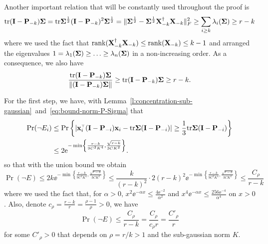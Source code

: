 \documentclass{article}
\begin{document}

Another important relation that will be constantly used throughout the proof is
\begin{equation}\label{eq:bound-trace-P-Sigma}
    \mathrm{tr} (\mathbf I - \mathbf P_{-k}) \mathbf{\Sigma} = \mathrm{tr} \mathbf{\Sigma}^{\frac12} (\mathbf I - \mathbf P_{-k})^2 \mathbf{\Sigma}^{\frac12} =
    \|\mathbf{\Sigma}^{\frac12}-\mathbf{\Sigma}^{\frac12}\mathbf X_{-k}^\dagger\mathbf X_{-k}\|_F^2\geq
\sum_{i\geq k}\lambda_i (\mathbf{\Sigma})\geq r-k
\end{equation}
where we used the fact that $\mathrm{rank}(\mathbf X_{-k}^\dagger \mathbf X_{-k}) \le \mathrm{rank}(\mathbf X_{-k}) \le k-1$ and arranged the eigenvalues $ 1 = \lambda_1(\mathbf{\Sigma}) \ge \ldots \ge \lambda_n(\mathbf{\Sigma})$ in a non-increasing order. As a consequence, we also have
\begin{equation}\label{eq:bound-norm-P-Sigma}
  \frac{\mathrm{tr} (\mathbf I - \mathbf P_{-k}) \mathbf{\Sigma}}{ \|  (\mathbf I - \mathbf P_{-k}) \mathbf{\Sigma} \| } \ge \mathrm{tr} (\mathbf I - \mathbf P_{-k}) \mathbf{\Sigma} \geq r-k.
\end{equation}

\bigskip

For the first step, we have, with Lemma~\ref{l:concentration-sub-gaussian}~and~\eqref{eq:bound-norm-P-Sigma} that
\begin{align*}
  \Pr (\neg E_i) &\le \Pr \left\{ \lvert \x_i^\top (\I - \P_{-i}) \x_i - \tr \Sigmab (\I - \P_{-i})  \rvert
    \geq \frac13 \tr \Sigmab (\I - \P_{-i}) \right\} \\ 
    &\le 2 \ee^{ - \min \left\{ \frac{ r -k }{9 C^2 K^4}, \frac{\sqrt{r -k} }{3 C K^2} \right\} }. %
\end{align*}
so that with the union bound we obtain
\begin{equation}\label{eq:union-bound-neg-E}
  \Pr (\neg E) \le 2k \ee^{ - \min \left\{ \frac{ r -k }{9 C^2 K^4}, \frac{\sqrt{r -k} }{3 C K^2} \right\} } \le \frac{k}{(r-k)^2} \cdot 2 (r-k)^2 \ee^{ - \min \left\{ \frac{ r -k }{9 C^2 K^4}, \frac{\sqrt{r -k} }{3 C K^2} \right\} } \le \frac{C_\rho}{r - k}
\end{equation}
where we used the fact that, for $\alpha >0$, $x^2 \ee^{-\alpha x} \le \frac{4 \ee^{-2}}{\alpha^2}$ and  $x^4 \ee^{-\alpha x} \le \frac{256 \ee^{-4}}{\alpha^4}$ on $x > 0$. Also, denote $c_\rho = \frac{r - k}r = \frac{\rho - 1}{\rho} > 0$, we have
\begin{equation}\label{eq:proba-E}
  \Pr(\neg E) \le \frac{C_\rho}{r - k} = \frac{C_\rho}{c_\rho r} = \frac{C'_\rho}{r} 
\end{equation}
for some $C'_\rho > 0$ that depends on $\rho = r/k > 1$ and the sub-gaussian norm $K$.
\end{document}
